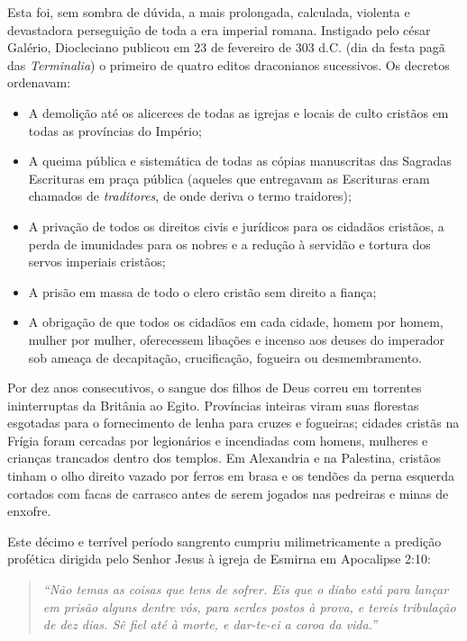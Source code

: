 Esta foi, sem sombra de dúvida, a mais prolongada, calculada, violenta e devastadora perseguição de toda a era imperial romana. Instigado pelo césar Galério, Diocleciano publicou em 23 de fevereiro de 303 d.C. (dia da festa pagã das \textit{Terminalia}) o primeiro de quatro editos draconianos sucessivos.
Os decretos ordenavam:
\begin{itemize}
  \item A demolição até os alicerces de todas as igrejas e locais de culto cristãos em todas as províncias do Império;
  \item A queima pública e sistemática de todas as cópias manuscritas das Sagradas Escrituras em praça pública (aqueles que entregavam as Escrituras eram chamados de \textit{traditores}, de onde deriva o termo traidores);
  \item A privação de todos os direitos civis e jurídicos para os cidadãos cristãos, a perda de imunidades para os nobres e a redução à servidão e tortura dos servos imperiais cristãos;
  \item A prisão em massa de todo o clero cristão sem direito a fiança;
  \item A obrigação de que todos os cidadãos em cada cidade, homem por homem, mulher por mulher, oferecessem libações e incenso aos deuses do imperador sob ameaça de decapitação, crucificação, fogueira ou desmembramento.
\end{itemize}


Por dez anos consecutivos, o sangue dos filhos de Deus correu em torrentes ininterruptas da Britânia ao Egito. Províncias inteiras viram suas florestas esgotadas para o fornecimento de lenha para cruzes e fogueiras; cidades cristãs na Frígia foram cercadas por legionários e incendiadas com homens, mulheres e crianças trancados dentro dos templos. Em Alexandria e na Palestina, cristãos tinham o olho direito vazado por ferros em brasa e os tendões da perna esquerda cortados com facas de carrasco antes de serem jogados nas pedreiras e minas de enxofre.

Este décimo e terrível período sangrento cumpriu milimetricamente a predição profética dirigida pelo Senhor Jesus à igreja de Esmirna em Apocalipse 2:10:

\begin{quote}
\itshape ``Não temas as coisas que tens de sofrer. Eis que o diabo está para lançar em prisão alguns dentre vós, para serdes postos à prova, e tereis tribulação de dez dias. Sê fiel até à morte, e dar-te-ei a coroa da vida.''
\end{quote}


